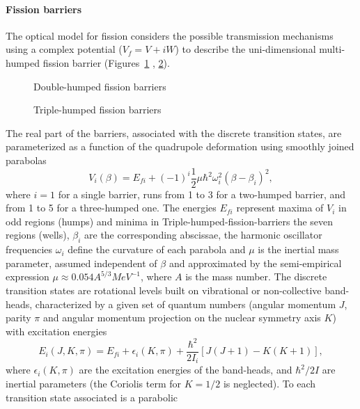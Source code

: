 \documentclass[twocolumn,amsmath,amssymb,10pt,groupedaddress,a4paper]{revtex4}
\begin{document}
\paragraph{Fission barriers}
The optical model for fission considers the possible transmission
mechanisms using a complex potential ($V_{f}=V+iW$) to describe the
uni-dimensional multi-humped fission barrier (Figures~\ref{cap:Double-humped-fission-barriers}
, \ref{cap:Triple-humped-fission-barriers}).
%
\begin{figure}[htbp]
\caption{\label{cap:Double-humped-fission-barriers}Double-humped fission
barriers}
\end{figure}
%
\begin{figure}[htbp]
\caption{\label{cap:Triple-humped-fission-barriers}Triple-humped fission
barriers}
\end{figure}
The real part of the barriers, associated with the discrete transition
states, are parameterized as a function of the quadrupole deformation
using smoothly joined parabolas
\begin{equation}
V_{i}(\beta)=E_{fi}+(-1)^{i}\frac{1}{2}\mu\hbar^{2}\omega_{i}^{2}(\beta-\beta_{i})^{2},
\label{vfund0}
\end{equation}
\noindent where $i=1$ for a single barrier, runs from 1 to 3 for a two-humped
barrier, and from 1 to 5 for a three-humped one. The energies $E_{fi}$
represent maxima of $V_{i}$ in odd regions (humps) and minima in
Triple-humped-fission-barriers the seven regions (wells), $\beta_{i}$ are the corresponding abscissae,
the harmonic oscillator frequencies $\omega_{i}$ define the curvature
of each parabola and $\mu$ is the inertial mass parameter, assumed
independent of $\beta$ and approximated by the semi-empirical expression
$\mu\approx0.054A^{5/3}MeV^{-1}$, where $A$ is the mass number.
The discrete transition states are rotational levels built on vibrational
or non-collective band-heads, characterized by a given set of quantum
numbers (angular momentum $J$, parity $\pi$ and angular momentum
projection on the nuclear symmetry axis $K$) with excitation energies
\begin{equation}
E_{i}(J,K,\pi)=E_{fi}+\epsilon_{i}(K,\pi)+\frac{\hbar^{2}}{2I_{i}}[J(J+1)-K(K+1)],
\label{tsrot}
\end{equation}
\noindent where $\epsilon_{i}(K,\pi)$ are the excitation energies of the band-heads,
and $\hbar^{2}/2I$ are inertial parameters (the Coriolis term for
$K=1/2$ is neglected). To each transition state associated is a parabolic
\end{document}
